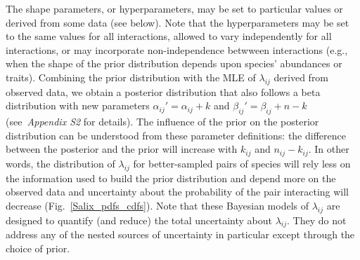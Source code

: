 \documentclass[12pt]{article}
\begin{document}
\begin{spacing}{2.0}
    The shape parameters, or hyperparameters, may be set to particular values or derived from some data (see below). Note that the hyperparameters may be set to the same values for all interactions, allowed to vary independently for all interactions, or may incorporate non-independence betwween interactions (e.g., when the shape of the prior distribution depends upon species' abundances or traits).
    Combining the prior distribution with the MLE of $\lambda_{ij}$ derived from observed data, we obtain a posterior distribution that also follows a beta distribution with new parameters $\alpha_{ij}'= \alpha_{ij}+k$ and $\beta_{ij}'=\beta_{ij}+n-k$ (see~\emph{Appendix S2} for details). The influence of the prior on the posterior distribution can be understood from these parameter definitions: the difference between the posterior and the prior will increase with $k_{ij}$ and $n_{ij}-k_{ij}$. In other words, the distribution of $\lambda_{ij}$ for better-sampled pairs of species will rely less on the information used to build the prior distribution and depend more on the observed data and uncertainty about the probability of the pair interacting will decrease (Fig.~\ref{Salix_pdfs_cdfs}). Note that these Bayesian models of $\lambda_{ij}$ are designed to quantify (and reduce) the total uncertainty about $\lambda_{ij}$. They do not address any of the nested sources of uncertainty in particular except through the choice of prior.







\end{spacing}
\end{document}
